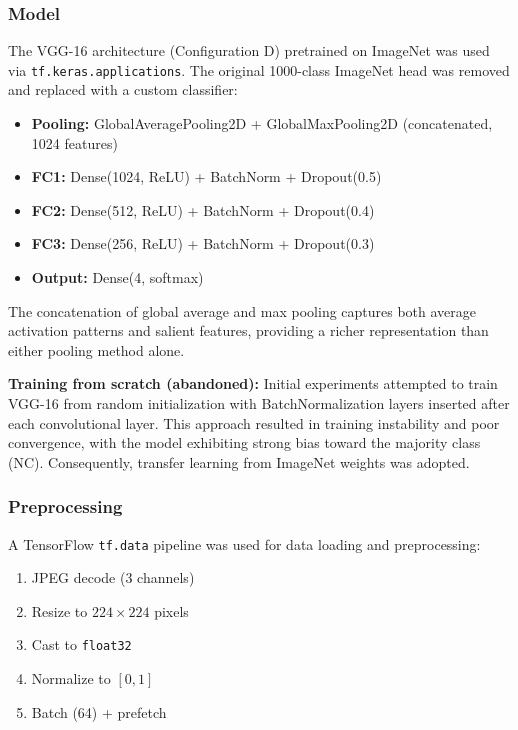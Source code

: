 \documentclass[conference]{IEEEtran}
\begin{document}
\subsubsection{\textbf{Model}}
The VGG-16 architecture (Configuration D) pretrained on ImageNet was used via \texttt{tf.keras.applications}. The original 1000-class ImageNet head was removed and replaced with a custom classifier:
\begin{itemize}
    \item \textbf{Pooling:} GlobalAveragePooling2D + GlobalMaxPooling2D (concatenated, 1024 features)
    \item \textbf{FC1:} Dense(1024, ReLU) + BatchNorm + Dropout(0.5)
    \item \textbf{FC2:} Dense(512, ReLU) + BatchNorm + Dropout(0.4)
    \item \textbf{FC3:} Dense(256, ReLU) + BatchNorm + Dropout(0.3)
    \item \textbf{Output:} Dense(4, softmax)
\end{itemize}
The concatenation of global average and max pooling captures both average activation patterns and salient features, providing a richer representation than either pooling method alone.

\textbf{Training from scratch (abandoned):} Initial experiments attempted to train VGG-16 from random initialization with BatchNormalization layers inserted after each convolutional layer. This approach resulted in training instability and poor convergence, with the model exhibiting strong bias toward the majority class (NC). Consequently, transfer learning from ImageNet weights was adopted.

\subsubsection{\textbf{Preprocessing}}
A TensorFlow \texttt{tf.data} pipeline was used for data loading and preprocessing:
\begin{enumerate}
    \item JPEG decode (3 channels)
    \item Resize to $224 \times 224$ pixels
    \item Cast to \texttt{float32}
    \item Normalize to $[0,1]$
    \item Batch (64) + prefetch
\end{enumerate}
\end{document}
